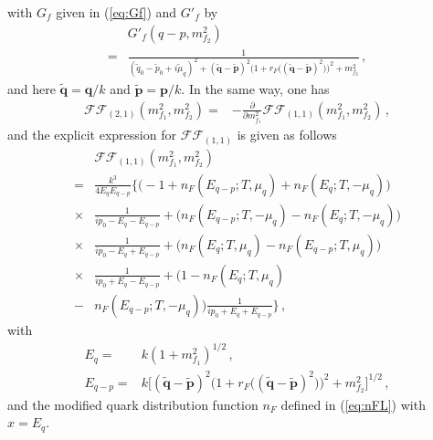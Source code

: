 \documentclass[%
reprint,
superscriptaddress,
showpacs,preprintnumbers,
 amsmath,amssymb,
 aps,
prd,
]{revtex4-1}
\def\eq#1{(\ref{#1})}
\begin{document}
%
with $G_{f}$ given in \eq{eq:Gf} and $G'_{f}$ by
%
\begin{align}
 &G'_{f}(q-p,m_{f_2}^2)\nonumber \\[1ex]
  =&\frac{1}{(\tilde{q}_0-\tilde{p}_0+i\tilde{\mu}_q)^2+(\tilde{
     \bm{q}}-\tilde{\bm{p}})^2\Big(1+r_F\big((\tilde{\bm{q}}
     -\tilde{\bm{p}})^2\big)\Big)^2+m_{f_2}^2}\,,
\end{align}
%
and here $\tilde{\bm{q}}=\bm{q}/k$ and $\tilde{\bm{p}}=\bm{p}/k$. In
the same way, one has
%
\begin{align}
  \mathcal{FF}_{(2,1)}(m_{f_1}^2,m_{f_2}^2)=
  &-\frac{\partial}{\partial m_{f_1}^2}
    \mathcal{FF}_{(1,1)}(m_{f_1}^2,m_{f_2}^2)\,,
\end{align}
%
and the explicit expression for $\mathcal{FF}_{(1,1)}$ is given as
follows
%
\begin{align}
  &\mathcal{FF}_{(1,1)}(m_{f_1}^2,m_{f_2}^2)\nonumber \\[1ex]
  =&\frac{k^3}{4 E_q E_{q-p}}\bigg\{\Big(-1+n_{F}(E_{q-p};T,\mu_q)+
     n_{F}(E_{q};T,-\mu_q)\Big)\nonumber\\[1ex]
  \times& \frac{1}{i p_0-E_q-E_{q-p}}+\Big(n_{F}(E_{q-p};T,-\mu_q)-
          n_{F}(E_{q};T,-\mu_q)\Big) \nonumber\\[1ex]
  \times& \frac{1}{i p_0-E_q+E_{q-p}}+\Big(n_{F}(E_{q};T,\mu_q)-
          n_{F}(E_{q-p};T,\mu_q)\Big)\nonumber\\[1ex]
  \times& \frac{1}{i p_0+E_q-E_{q-p}}+\Big(1-
          n_{F}(E_{q};T,\mu_q)\nonumber\\[1ex]
  -&n_{F}(E_{q-p};T,-\mu_q)\Big) \frac{1}{i p_0+E_q+E_{q-p}}\bigg\}\,,
\end{align}
%
with 
%
\begin{align}
  E_q=&k(1+m_{f_1}^2)^{1/2}\,,\\[1ex]
  E_{q-p}=&k\Big[(\tilde{\bm{q}}-\tilde{\bm{p}})^2\Big(1+r_F
            \big((\tilde{\bm{q}}-\tilde{\bm{p}})^2\big)\Big)^2
            +m_{f_2}^2\Big]^{1/2}\,,
\end{align}
%
and the modified quark distribution function $n_{F}$ defined in
\eq{eq:nFL} with $x = E_q$.



\endgroup





\end{document}
